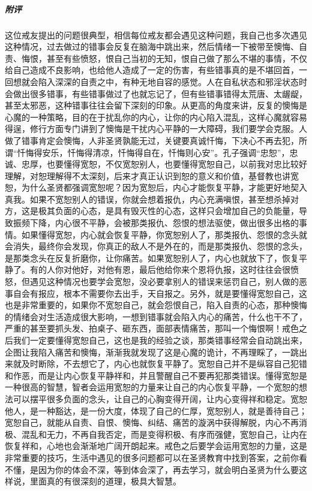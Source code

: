 \begin{case}
    \subparagraph{附评} 这位戒友提出的问题很典型，相信每位戒友都会遇见这种问题，我自己也多次遇见这种情况，过去做过的错事会反复在脑海中跳出来，然后情绪一下被带至懊悔、自责、悔恨，甚至有些愤怒，恨自己当初的无知，恨自己做了那么不堪的事情，不仅给自己造成不良影响，也给他人造成了一定的伤害，有些错事真的是不堪回首，一回想就会陷入深深的自责之中，有种无地自容的感觉。人在自私状态和邪淫状态时会做出很多错事，有些错事做过了也就忘记了，但有些错事错得太荒唐、太龌龊，甚至太邪恶，这种错事往往会留下深刻的印象。从更高的角度来讲，反复的懊悔是心魔的一种策略，目的在于扰乱你的内心，让你的内心陷入混乱，这样心魔就容易得逞，修行方面专门讲到了懊悔是干扰内心平静的一大障碍，我们要学会克服。人做了错事肯定会懊悔，人非圣贤孰能无过，关键要真诚忏悔，下决心不再去犯，所谓“忏悔得安乐，忏悔得清凉，忏悔得自在，忏悔则心安”。孔子强调“忠恕”，忠诚、忠厚，也要懂得宽恕，不仅宽恕别人，也要懂得宽恕自己，以前我对忠比较好理解，对恕理解得不太深刻，后来才真正认识到恕的意义和价值，基督教也讲宽恕，为什么圣贤都强调宽恕呢？因为宽恕后，内心才能恢复平静，才能更好地契入真我。如果不宽恕别人的错误，你就会想着报仇，内心充满嗔恨，甚至想杀掉对方，这是极其负面的心态，是具有毁灭性的心态，这样只会增加自己的负能量，导致振频下降，内心很不平静，会被那类报仇、怨恨的想法驱使，做出很多出格的事情。如果懂得宽恕，内心就会恢复平静，你宽恕别人了，那类报仇、怨恨的念头就会消失，最终你会发现，你真正的敌人不是外在的，而是那类报仇、怨恨的念头，是那类念头在反复折磨你，让你痛苦。如果宽恕别人了，内心也就放下了，恢复平静了。有的人你对他好，对他有恩，最后他给你来个恩将仇报，这时往往会很愤怒，但遇见这种情况也要学会宽恕，没必要拿别人的错误来惩罚自己，别人做的恶事自会有报应，根本不需要你去出手，天自报之。另外，就是要懂得宽恕自己，这也是非常重要的，如果你不宽恕自己，就会怨恨自己，陷入自责的心态，那种懊悔的情绪会对生活造成很大影响，一想到错事就会陷入内心的痛苦，什么也干不了，严重的甚至要抓头发、拍桌子、砸东西，面部表情痛苦，那叫一个悔恨啊！戒色之后我们一定要懂得宽恕自己，这也是我的经验之谈，那类错事经常会自动跳出来，企图让我陷入痛苦和懊悔，渐渐我就发现了这是心魔的诡计，不再理睬了，一跳出来就及时断除，不去想它了，内心也就恢复平静了。宽恕自己并不是纵容自己犯错和作恶，而是让内心恢复平静祥和，并且警醒自己不要再犯那类错误。懂得宽恕是一种很高的智慧，智者会运用宽恕的力量来让自己的内心恢复平静，一个宽恕的想法可以摆平很多负面的念头，让自己的心胸变得开阔，让内心变得祥和稳定。宽恕他人，是一种豁达，是一份大度，体现了自己的仁厚，宽恕别人，就是善待自己；宽恕自己，就能从自责、自恨、懊悔、纠结、痛苦的漩涡中获得解脱，内心不再消极、混乱和无力，不再自我否定，而是变得积极、有序而强健，宽恕自己，让内在恢复祥和，心地也会渐渐地广阔开朗起来。戒色之后要学会运用宽恕的力量，这是非常重要的技巧，生活中遇见的很多问题都可以在圣贤教育中找到答案，之前你看不懂，是因为你的体会不深，等到体会深了，再去学习，就会明白圣贤为什么要这样说，里面真的有很深刻的道理，极具大智慧。
\end{case}

